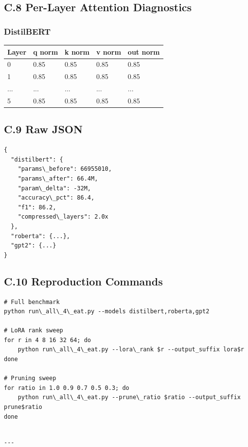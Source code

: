 \subsection{C.8 Per-Layer Attention Diagnostics}

\subsubsection{DistilBERT}

\begin{table}[H]
\centering
\small
\begin{tabular}{lllll}
\toprule
\textbf{Layer} & \textbf{q norm} & \textbf{k norm} & \textbf{v norm} & \textbf{out norm} \\
\midrule
0 & 0.85 & 0.85 & 0.85 & 0.85 \\
1 & 0.85 & 0.85 & 0.85 & 0.85 \\
... & ... & ... & ... & ... \\
5 & 0.85 & 0.85 & 0.85 & 0.85 \\
\bottomrule
\end{tabular}
\end{table}

\subsection{C.9 Raw JSON}

\begin{lstlisting}
{
  "distilbert": {
    "params\_before": 66955010,
    "params\_after": 66.4M,
    "param\_delta": -32M,
    "accuracy\_pct": 86.4,
    "f1": 86.2,
    "compressed\_layers": 2.0x
  },
  "roberta": {...},
  "gpt2": {...}
}
\end{lstlisting}

\subsection{C.10 Reproduction Commands}

\begin{lstlisting}
# Full benchmark
python run\_all\_4\_eat.py --models distilbert,roberta,gpt2

# LoRA rank sweep
for r in 4 8 16 32 64; do
    python run\_all\_4\_eat.py --lora\_rank $r --output_suffix lora$r
done

# Pruning sweep
for ratio in 1.0 0.9 0.7 0.5 0.3; do
    python run\_all\_4\_eat.py --prune\_ratio $ratio --output_suffix prune$ratio
done
\end{lstlisting}
\begin{lstlisting}

---
\end{lstlisting}